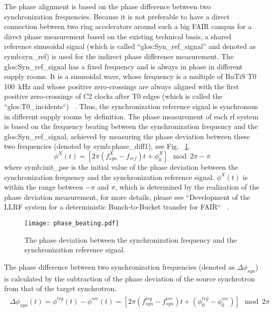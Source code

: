 The phase alignment is based on the phase difference between two synchronization frequencies. Because it is not preferable to have a direct connection between two ring accelerators around such a big FAIR campus for a direct phase measurement based on the existing technical basis, a shared reference sinusoidal signal (which is called “\gls{glos:Syn_ref_signal}” and denoted as \gls{symb:syn_ref}) is used for the indirect phase difference measurement. The \gls{glos:Syn_ref_signal} has a fixed frequency and is always in phase in different supply rooms. It is a sinusoidal wave, whose frequency is a multiple of BuTiS T0 \SI{100}{kHz} and whose positive zero-crossings are always aligned with the first positive zero-crossings of C2 clocks after T0 edges (which is called the ``\gls{glos:T0_incidents}``) ~\cite{ferrand_system_2014, ferrand_system_2015}. Thus, the synchronization reference signal is synchronous in different supply rooms by definition. The phase measurement of each rf system is based on the frequency beating between the synchronization frequency and the \gls{glos:Syn_ref_signal}, achieved by measuring the phase deviation between these two frequencies (denoted by \gls{symb:phase_diff1}), see Fig. ~\ref{phase_diffe_align}. 
\begin{equation}
\phi^X(t)= [2\pi(f_\mathit{syn}^{X}-f_\mathit{ref})t+\phi^X_0] \mod 2\pi - \pi
\end{equation}
where \gls{symb:init_pse} is the initial value of the phase deviation between the synchronization frequency and the synchronization reference signal. $\phi^X(t)$ is within the range between $-\pi$ and $\pi$, which is determined by the realization of the phase deviation measurement, for more details, please see ``Development of the LLRF system for a deterministic Bunch-to-Bucket transfer for FAIR`` ~\cite{ferrand_development_????}.
\begin{figure}[!htb]
   \centering   
   \texttt{[image: phase\_beating.pdf]}
   \caption{The phase deviation between the synchronization frequency and the synchronization reference signal.}
   \label{phase_diffe_align}
\end{figure}

The phase difference between two synchronization frequencies (denoted as $\Delta \phi_\mathit{syn}$) is calculated by the subtraction of the phase deviation of the source synchrotron from that of the target synchrotron. 
\begin{eqnarray}
\begin{aligned}
\Delta \phi_\mathit{syn}(t)
=\phi^\mathit{trg}(t)-\phi^\mathit{src}(t)=[2\pi(f_\mathit{syn}^{trg}-f_\mathit{syn}^{src})t+(\phi^\mathit{trg}_0-\phi^\mathit{src}_0)] \mod 2\pi
\label{phase_diff_dev}
\end{aligned}
\end{eqnarray}

